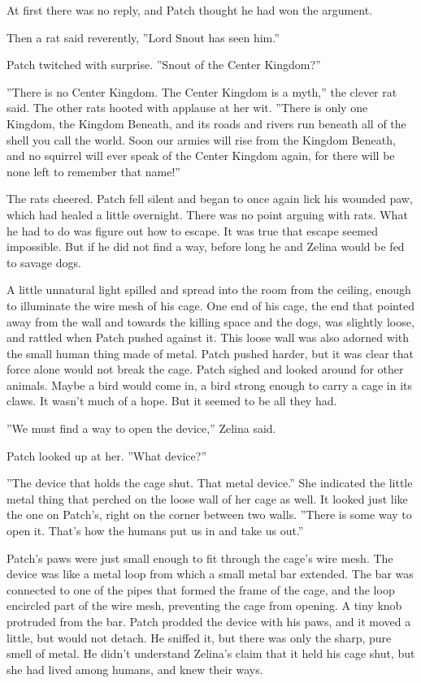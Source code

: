 \documentclass[12pt]{book}
\begin{document}
At first there was no reply, and Patch thought he had won the argument.

Then a rat said reverently, ''Lord Snout has seen him.''

Patch twitched with surprise. ''Snout of the Center Kingdom?''

''There is no Center Kingdom. The Center Kingdom is a myth,'' the clever rat said. The other rats hooted with applause at her wit. ''There is only one Kingdom, the Kingdom Beneath, and its roads and rivers run beneath all of the shell you call the world. Soon our armies will rise from the Kingdom Beneath, and no squirrel will ever speak of the Center Kingdom again, for there will be none left to remember that name!''

The rats cheered. Patch fell silent and began to once again lick his wounded paw, which had healed a little overnight. There was no point arguing with rats. What he had to do was figure out how to escape. It was true that escape seemed impossible. But if he did not find a way, before long he and Zelina would be fed to savage dogs.

A little unnatural light spilled and spread into the room from the ceiling, enough to illuminate the wire mesh of his cage. One end of his cage, the end that pointed away from the wall and towards the killing space and the dogs, was slightly loose, and rattled when Patch pushed against it. This loose wall was also adorned with the small human thing made of metal. Patch pushed harder, but it was clear that force alone would not break the cage. Patch sighed and looked around for other animals. Maybe a bird would come in, a bird strong enough to carry a cage in its claws. It wasn't much of a hope. But it seemed to be all they had.

''We must find a way to open the device,'' Zelina said.

Patch looked up at her. ''What device?''

''The device that holds the cage shut. That metal device.'' She indicated the little metal thing that perched on the loose wall of her cage as well. It looked just like the one on Patch's, right on the corner between two walls. ''There is some way to open it. That's how the humans put us in and take us out.''

Patch's paws were just small enough to fit through the cage's wire mesh. The device was like a metal loop from which a small metal bar extended. The bar was connected to one of the pipes that formed the frame of the cage, and the loop encircled part of the wire mesh, preventing the cage from opening. A tiny knob protruded from the bar. Patch prodded the device with his paws, and it moved a little, but would not detach. He sniffed it, but there was only the sharp, pure smell of metal. He didn't understand Zelina's claim that it held his cage shut, but she had lived among humans, and knew their ways.
\end{document}
